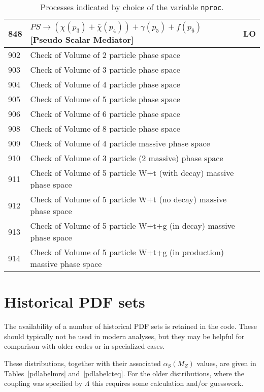 \documentclass{article}
\begin{document}
{{{{{{\begin{table}
\begin{center}
\begin{tabular}{|l|l|l|}
848 & $PS\to({\chi}(p_3)+\bar{\chi}(p_4)) +\gamma(p_5)+f(p_6)$ [Pseudo Scalar Mediator]  & LO\\
\hline
902 & Check of Volume of 2 particle phase space & \\  
903 & Check of Volume of 3 particle phase space & \\  
904 & Check of Volume of 4 particle phase space & \\  
905 & Check of Volume of 5 particle phase space & \\  
906 & Check of Volume of 6 particle phase space & \\  
908 & Check of Volume of 8 particle phase space & \\  
909 & Check of Volume of 4 particle massive phase space & \\  
910 & Check of Volume of 3 particle (2 massive) phase space & \\  
911 & Check of Volume of 5 particle W+t (with decay) massive phase space & \\  
912 & Check of Volume of 5 particle W+t (no decay) massive phase space & \\  
913 & Check of Volume of 5 particle W+t+g (in decay) massive phase space & \\  
914 & Check of Volume of 5 particle W+t+g (in production) massive phase space & \\  
\hline 
\hline
\end{tabular}
\caption{Processes indicated by choice of the variable {\tt nproc}.\label{nproctable}}
\end{center}
\end{table}
\clearpage


\section{Historical PDF sets}
\label{olderPDFs}
The availability of a number of historical PDF sets is retained in the code.  These should
typically not be used in modern analyses, but they may be helpful for comparison with
older codes or in specialized cases.

These distributions, together with their associated $\alpha_S(M_Z)$
values, are given in Tables~\ref{pdlabelmrs} and~\ref{pdlabelcteq}. 
For the older distributions, where the
coupling was specified by $\Lambda$ this requires 
some calculation and/or guesswork.

}}}}}}
\end{document}
